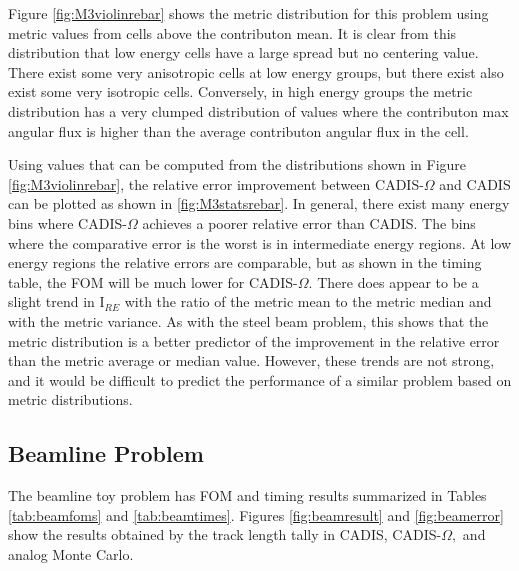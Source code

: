 Figure \ref{fig:M3violinrebar} shows the metric
distribution for this problem using metric values from cells above the
contributon mean. It is clear from this distribution that low energy cells have
a large spread but no centering value. There exist some very anisotropic cells
at low energy groups, but there exist also exist some very isotropic cells.
Conversely, in high energy groups the metric distribution has a very clumped
distribution of values where the contributon max angular flux is higher than the
average contributon angular flux in the cell.

Using values that can be computed from the distributions shown in Figure
\ref{fig:M3violinrebar}, the relative error improvement between CADIS-$\Omega$
and CADIS can be plotted as shown in \ref{fig:M3statsrebar}. In general, there
exist many energy bins where CADIS-$\Omega$ achieves a poorer relative error
than CADIS. The bins where the comparative error is the worst is in intermediate
energy regions. At low energy regions the relative errors are comparable, but as
shown in the timing table, the FOM will be much lower for CADIS-$\Omega$. There
does appear to be a slight trend in I$_{RE}$ with the ratio of the metric mean
to the metric median and with the metric variance. As with the steel beam
problem, this shows that the metric distribution is a better predictor of the
improvement in the relative error than the metric average or median value.
However, these trends are not strong, and it would be difficult to predict the
performance of a similar problem based on metric distributions.

%

\subsection{Beamline Problem}
\label{subsec:resultsbeam}

The beamline toy problem has FOM and timing
results summarized in Tables
\ref{tab:beamfoms} and \ref{tab:beamtimes}. Figures
\ref{fig:beamresult} and \ref{fig:beamerror} show the results obtained
by the track length tally in CADIS, CADIS-$\Omega,$ and analog
Monte Carlo.

